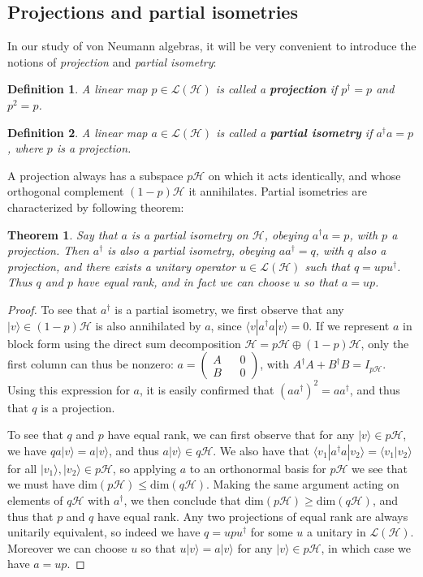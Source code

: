 \documentclass[12pt]{article}
\newcommand{\lan}{\langle}
\newcommand{\ran}{\rangle}
\newcommand{\Ll}{\mathcal{L}}
\newcommand{\Hh}{\mathcal{H}}
\newcommand{\LH}{\Ll(\Hh)}
\newtheorem{mydef}{Definition}[section]
\newtheorem{thm}{Theorem}[section]
\begin{document}
\subsection{Projections and partial isometries}
In our study of von Neumann algebras, it will be very convenient to introduce the notions of \textit{projection} and \textit{partial isometry}:
\begin{mydef}
A linear map $p\in \LH$ is called a \textbf{projection} if $p^\dagger=p$ and $p^2=p$.
\end{mydef}
\begin{mydef}
A linear map $a\in \LH$ is called a \textbf{partial isometry} if $a^\dagger a=p$, where $p$ is a projection.  
\end{mydef}
A projection always has a subspace $p\mathcal{H}$ on which it acts identically, and whose orthogonal complement $(1-p)\Hh$ it annihilates.  Partial isometries are characterized by following theorem:
\begin{thm}\label{pithm}
Say that $a$ is a partial isometry on $\Hh$, obeying $a^\dagger a=p$, with $p$ a projection. Then $a^\dagger$ is also a partial isometry, obeying $a a^\dagger =q$, with $q$ also a projection, and there exists a unitary operator $u\in \LH$ such that $q=upu^\dagger$.  Thus $q$ and $p$ have equal rank, and in fact we can choose $u$ so that $a=up$.
\end{thm}
\begin{proof}
To see that $a^\dagger$ is a partial isometry, we first observe that any $|v\ran\in (1-p)\Hh$ is also annihilated by $a$, since $\lan v|a^\dagger a|v\ran=0$.  If we represent $a$ in block form using the direct sum decomposition $\mathcal{H}=p\Hh \oplus (1-p)\Hh$, only the first column can thus be nonzero: $a=\begin{pmatrix} A && 0 \\ B && 0\end{pmatrix}$, with $A^\dagger A+B^\dagger B=I_{p\Hh}$.  Using this expression for $a$, it is easily confirmed that $(aa^\dagger)^2=aa^\dagger$, and thus that $q$ is a projection.  

To see that $q$ and $p$ have equal rank, we can first observe that for any $|v\ran \in p\Hh$, we have $qa|v\ran=a|v\ran$, and thus $a|v\ran\in q\Hh$.  We also have that $\lan v_1|a^\dagger a|v_2\ran=\lan v_1|v_2\ran$ for all $|v_1\ran,|v_2\ran\in p\Hh$, so applying $a$ to an orthonormal basis for $p\Hh$ we see that we must have $\mathrm{dim}(p\Hh)\leq \mathrm{dim}(q\Hh)$.  Making the same argument acting on elements of $q\Hh$ with $a^\dagger$, we then conclude that $\mathrm{dim}(p\Hh)\geq \mathrm{dim}(q\Hh)$, and thus that $p$ and $q$ have equal rank.  Any two projections of equal rank are always unitarily equivalent, so indeed we have $q=upu^\dagger$ for some $u$ a unitary in $\LH$.  Moreover we can choose $u$ so that $u|v\ran=a|v\ran$ for any $|v\ran\in p\Hh$, in which case we have $a=up$.
\end{proof}
\end{document}
